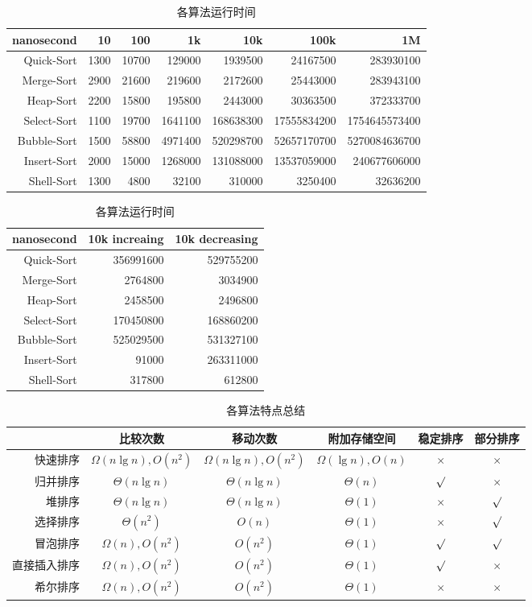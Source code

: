 \begin{table}
\centering    
\begin{tabular}[h]{r|r|r|r|r|r|r}
      nanosecond  & 10   &  100   &   1k    &    10k    &   100k   &   1M   \\\hline
Quick-Sort& 1300& 10700& 129000& 1939500& 24167500& 283930100\\\hline
Merge-Sort& 2900& 21600& 219600& 2172600& 25443000& 283943100 \\\hline
Heap-Sort& 2200& 15800& 195800& 2443000& 30363500& 372333700 \\\hline
Select-Sort& 1100& 19700& 1641100& 168638300& 17555834200& 1754645573400 \\\hline
Bubble-Sort& 1500& 58800& 4971400& 520298700& 52657170700& 5270084636700 \\\hline
Insert-Sort& 2000& 15000& 1268000& 131088000& 13537059000& 240677606000 \\\hline
Shell-Sort& 1300& 4800& 32100& 310000& 3250400& 32636200 
\end{tabular}
\begin{tabular}[h]{r|r|r}
      nanosecond  &10k increaing&10k decreasing  \\\hline
Quick-Sort& 356991600& 529755200 \\\hline
Merge-Sort&  2764800& 3034900 \\\hline
Heap-Sort&  2458500& 2496800 \\\hline
Select-Sort&  170450800& 168860200 \\\hline
Bubble-Sort&  525029500& 531327100 \\\hline
Insert-Sort&  91000& 263311000 \\\hline
Shell-Sort&  317800& 612800 
\end{tabular}
\caption{各算法运行时间}
\end{table}
\begin{table}
\centering    
\begin{tabular}[h]{r|c|c|c|c|c}
       &比较次数&移动次数&附加存储空间&稳定排序&部分排序\\
\hline 快速排序&   $\Omega(n\lg n),O(n^2)$   &  $\Omega(n\lg n),O(n^2)$ &    $\Omega(\lg n),O(n)$     &   $\times$     &   $\times$  \\
\hline 归并排序&   $\Theta(n\lg n)$   & $\Theta(n\lg n)$  &    $\Theta(n)$     &    $\surd$    &   $\times$   \\
\hline 堆排序&    $\Theta(n\lg n)$   & $\Theta(n\lg n)$ &     $\Theta(1)$    &     $\times$   &    $\surd$  \\
\hline 选择排序&    $\Theta(n^2)$  & $O(n)$  &    $\Theta(1)$     &    $\times$    &   $\surd$   \\
\hline 冒泡排序&   $\Omega(n),O(n^2)$    & $O(n^2)$ &    $\Theta(1)$     &     $\surd$   &   $\surd$   \\
\hline 直接插入排序&  $\Omega(n),O(n^2)$  & $O(n^2)$    &   $\Theta(1)$      &   $\surd$     &    $\times$  \\
\hline 希尔排序&   $\Omega(n),O(n^2)$   &  $O(n^2)$  &   $\Theta(1)$      &     $\times$   &    $\times$  \\
\end{tabular}
\caption{各算法特点总结}
\end{table}
